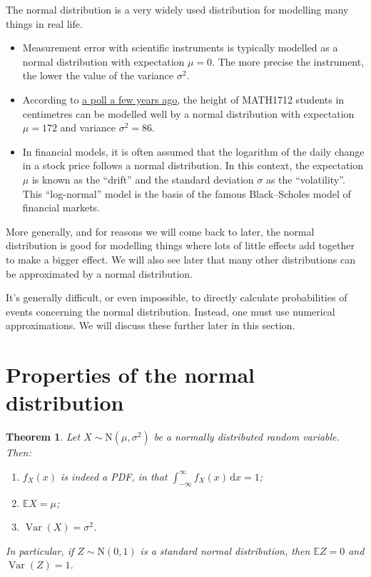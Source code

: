 \documentclass[
  a4paper,
]{book}
\providecommand{\tightlist}{%
  \setlength{\itemsep}{0pt}\setlength{\parskip}{0pt}}
\newtheorem{theorem}{Theorem}[chapter]
\theoremstyle{definition}
\theoremstyle{definition}
\theoremstyle{definition}
\theoremstyle{definition}
\theoremstyle{remark}
\begin{document}
The normal distribution is a very widely used distribution for modelling many things in real life.

\begin{itemize}
\item
  Measurement error with scientific instruments is typically modelled as a normal distribution with expectation \(\mu = 0\). The more precise the instrument, the lower the value of the variance \(\sigma^2\).
\item
  According to \href{http://www1.maths.leeds.ac.uk/~voss/2019/MATH1712/index.html}{a poll a few years ago}, the height of MATH1712 students in centimetres can be modelled well by a normal distribution with expectation \(\mu = 172\) and variance \(\sigma^2 = 86\).
\item
  In financial models, it is often assumed that the logarithm of the daily change in a stock price follows a normal distribution. In this context, the expectation \(\mu\) is known as the ``drift'' and the standard deviation \(\sigma\) as the ``volatility''. This ``log-normal'' model is the basis of the famous Black--Scholes model of financial markets.
\end{itemize}

More generally, and for reasons we will come back to later, the normal distribution is good for modelling things where lots of little effects add together to make a bigger effect. We will also see later that many other distributions can be approximated by a normal distribution.

It's generally difficult, or even impossible, to directly calculate probabilities of events concerning the normal distribution. Instead, one must use numerical approximations. We will discuss these further later in this section.

\hypertarget{normal-properties}{%
\section{Properties of the normal distribution}\label{normal-properties}}

\begin{theorem}
\protect\hypertarget{thm:norm-prop}{}\label{thm:norm-prop}Let \(X \sim \mathrm{N}(\mu, \sigma^2)\) be a normally distributed random variable. Then:

\begin{enumerate}
\def\labelenumi{\arabic{enumi}.}
\tightlist
\item
  \(f_X(x)\) is indeed a PDF, in that \(\displaystyle\int_{-\infty}^\infty f_X(x)\,\mathrm dx = 1\);
\item
  \(\mathbb EX = \mu\);
\item
  \(\operatorname{Var}(X) = \sigma^2\).
\end{enumerate}

In particular, if \(Z \sim \mathrm{N}(0, 1)\) is a standard normal distribution, then \(\mathbb EZ = 0\) and \(\operatorname{Var}(Z) = 1\).
\end{theorem}
\end{document}
